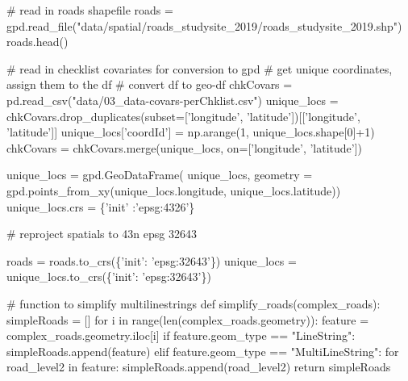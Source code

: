 \documentclass[]{article}
\newenvironment{Shaded}{}{}
\newcommand{\BuiltInTok}[1]{#1}
\newcommand{\CommentTok}[1]{\textcolor[rgb]{0.00,0.50,0.00}{#1}}
\newcommand{\ControlFlowTok}[1]{\textcolor[rgb]{0.00,0.00,1.00}{#1}}
\newcommand{\DecValTok}[1]{#1}
\newcommand{\KeywordTok}[1]{\textcolor[rgb]{0.00,0.00,1.00}{#1}}
\newcommand{\NormalTok}[1]{#1}
\newcommand{\OperatorTok}[1]{#1}
\newcommand{\StringTok}[1]{\textcolor[rgb]{0.00,0.50,0.50}{#1}}
\begin{document}
\begin{Shaded}
\begin{Highlighting}[numbers=left,,]
\CommentTok{# read in roads shapefile}
\NormalTok{roads }\OperatorTok{=}\NormalTok{ gpd.read_file(}\StringTok{"data/spatial/roads_studysite_2019/roads_studysite_2019.shp"}\NormalTok{)}
\NormalTok{roads.head()}

\CommentTok{# read in checklist covariates for conversion to gpd}
\CommentTok{# get unique coordinates, assign them to the df}
\CommentTok{# convert df to geo-df}
\NormalTok{chkCovars }\OperatorTok{=}\NormalTok{ pd.read_csv(}\StringTok{"data/03_data-covars-perChklist.csv"}\NormalTok{)}
\NormalTok{unique_locs }\OperatorTok{=}\NormalTok{ chkCovars.drop_duplicates(subset}\OperatorTok{=}\NormalTok{[}\StringTok{'longitude'}\NormalTok{,}
                                         \StringTok{'latitude'}\NormalTok{])[[}\StringTok{'longitude'}\NormalTok{, }\StringTok{'latitude'}\NormalTok{]]}
\NormalTok{unique_locs[}\StringTok{'coordId'}\NormalTok{] }\OperatorTok{=}\NormalTok{ np.arange(}\DecValTok{1}\NormalTok{, unique_locs.shape[}\DecValTok{0}\NormalTok{]}\OperatorTok{+}\DecValTok{1}\NormalTok{)}
\NormalTok{chkCovars }\OperatorTok{=}\NormalTok{ chkCovars.merge(unique_locs, on}\OperatorTok{=}\NormalTok{[}\StringTok{'longitude'}\NormalTok{, }\StringTok{'latitude'}\NormalTok{])}

\NormalTok{unique_locs }\OperatorTok{=}\NormalTok{ gpd.GeoDataFrame(}
\NormalTok{unique_locs, }
\NormalTok{geometry }\OperatorTok{=}\NormalTok{ gpd.points_from_xy(unique_locs.longitude, unique_locs.latitude))}
\NormalTok{unique_locs.crs }\OperatorTok{=}\NormalTok{ \{}\StringTok{'init'}\NormalTok{ :}\StringTok{'epsg:4326'}\NormalTok{\}}

\CommentTok{# reproject spatials to 43n epsg 32643}

\NormalTok{roads }\OperatorTok{=}\NormalTok{ roads.to_crs(\{}\StringTok{'init'}\NormalTok{: }\StringTok{'epsg:32643'}\NormalTok{\})}
\NormalTok{unique_locs }\OperatorTok{=}\NormalTok{ unique_locs.to_crs(\{}\StringTok{'init'}\NormalTok{: }\StringTok{'epsg:32643'}\NormalTok{\})}

\CommentTok{# function to simplify multilinestrings}
\KeywordTok{def}\NormalTok{ simplify_roads(complex_roads):}
\NormalTok{    simpleRoads }\OperatorTok{=}\NormalTok{ []}
    \ControlFlowTok{for}\NormalTok{ i }\KeywordTok{in} \BuiltInTok{range}\NormalTok{(}\BuiltInTok{len}\NormalTok{(complex_roads.geometry)):}
\NormalTok{        feature }\OperatorTok{=}\NormalTok{ complex_roads.geometry.iloc[i]}
        \ControlFlowTok{if}\NormalTok{ feature.geom_type }\OperatorTok{==} \StringTok{"LineString"}\NormalTok{:}
\NormalTok{            simpleRoads.append(feature)}
        \ControlFlowTok{elif}\NormalTok{ feature.geom_type }\OperatorTok{==} \StringTok{"MultiLineString"}\NormalTok{:}
            \ControlFlowTok{for}\NormalTok{ road_level2 }\KeywordTok{in}\NormalTok{ feature:}
\NormalTok{                simpleRoads.append(road_level2)}
    \ControlFlowTok{return}\NormalTok{ simpleRoads}


\end{Highlighting}
\end{Shaded}
\end{document}
